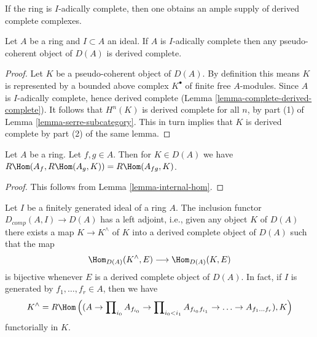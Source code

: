 \noindent
If the ring is $I$-adically complete, then one obtains an ample supply
of derived complete complexes.

\begin{lemma}
\label{lemma-pseudo-coherent-is-derived-complete}
Let $A$ be a ring and $I \subset A$ an ideal. If $A$ is $I$-adically complete
then any pseudo-coherent object of $D(A)$ is derived complete.
\end{lemma}

\begin{proof}
Let $K$ be a pseudo-coherent object of $D(A)$. By definition this
means $K$ is represented by a bounded above complex $K^\bullet$
of finite free $A$-modules. Since $A$ is $I$-adically complete, hence
derived complete (Lemma \ref{lemma-complete-derived-complete}).
It follows that $H^n(K)$ is derived complete for all $n$, by part (1)
of Lemma \ref{lemma-serre-subcategory}. This in turn implies that
$K$ is derived complete by part (2) of the same lemma.
\end{proof}

\begin{lemma}
\label{lemma-double-localize}
Let $A$ be a ring. Let $f, g \in A$. Then for $K \in D(A)$ we have
$R\Hom(A_f, R\Hom(A_g, K)) = R\Hom(A_{fg}, K)$.
\end{lemma}

\begin{proof}
This follows from Lemma \ref{lemma-internal-hom}.
\end{proof}

\begin{lemma}
\label{lemma-derived-completion}
Let $I$ be a finitely generated ideal of a ring $A$.
The inclusion functor $D_{comp}(A, I) \to D(A)$ has a
left adjoint, i.e., given any object $K$ of $D(A)$ there
exists a map $K \to K^\wedge$ of $K$ into a derived complete
object of $D(A)$ such that the map
$$
\Hom_{D(A)}(K^\wedge, E) \longrightarrow \Hom_{D(A)}(K, E)
$$
is bijective whenever $E$ is a derived complete object of $D(A)$.
In fact, if $I$ is generated by $f_1, \ldots, f_r \in A$, then we have
$$
K^\wedge = R\Hom\left((A \to \prod\nolimits_{i_0} A_{f_{i_0}} \to
\prod\nolimits_{i_0 < i_1} A_{f_{i_0}f_{i_1}}
\to \ldots \to A_{f_1\ldots f_r}), K\right)
$$
functorially in $K$.
\end{lemma}

